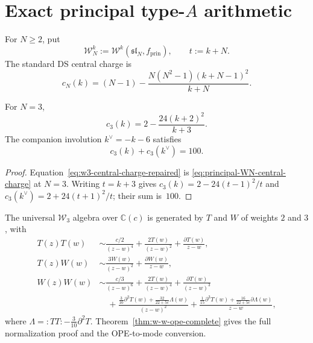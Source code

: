 \section{Exact principal type-$A$ arithmetic}

For $N\ge2$, put
\[
\mathcal W_N^k:=\mathcal W^k(\mathfrak{sl}_N,f_{\mathrm{prin}}),
\qquad t:=k+N.
\]
The standard DS central charge is
\begin{equation}\label{eq:principal-WN-central-charge}
c_N(k)
=(N-1)-\frac{N(N^2-1)(k+N-1)^2}{k+N}.
\end{equation}

\begin{proposition}
\label{prop:w3-central-charge}
For $N=3$,
\begin{equation}\label{eq:w3-central-charge-repaired}
c_3(k)=2-\frac{24(k+2)^2}{k+3}.
\end{equation}
The companion involution $k^\vee=-k-6$ satisfies
\begin{equation}\label{eq:w3-central-sum}
c_3(k)+c_3(k^\vee)=100.
\end{equation}
\end{proposition}

\begin{proof}
Equation~\eqref{eq:w3-central-charge-repaired} is
\eqref{eq:principal-WN-central-charge} at $N=3$.  Writing $t=k+3$
gives
$c_3(k)=2-24(t-1)^2/t$ and
$c_3(k^\vee)=2+24(t+1)^2/t$; their sum is~$100$.
\end{proof}

\begin{definition}
\label{def:w3-algebra}
The universal $\mathcal W_3$ algebra over $\mathbb C(c)$ is generated
by $T$ and $W$ of weights $2$ and $3$, with
\begin{align}
T(z)T(w)&\sim \frac{c/2}{(z-w)^4}
+\frac{2T(w)}{(z-w)^2}+\frac{\partial T(w)}{z-w},\nonumber\\
T(z)W(w)&\sim \frac{3W(w)}{(z-w)^2}
+\frac{\partial W(w)}{z-w},\nonumber\\
W(z)W(w)&\sim \frac{c/3}{(z-w)^6}
+\frac{2T(w)}{(z-w)^4}+\frac{\partial T(w)}{(z-w)^3}\nonumber\\
&\quad+\frac{\frac3{10}\partial^2T(w)
+\frac{32}{22+5c}\Lambda(w)}{(z-w)^2}
+\frac{\frac1{15}\partial^3T(w)
+\frac{16}{22+5c}\partial\Lambda(w)}{z-w},
\label{eq:w3-ope-repaired}
\end{align}
where
$\Lambda={:}TT{:}-\frac3{10}\partial^2T$.
Theorem~\ref{thm:w-w-ope-complete} gives the full normalization proof
and the OPE-to-mode conversion.
\end{definition}

